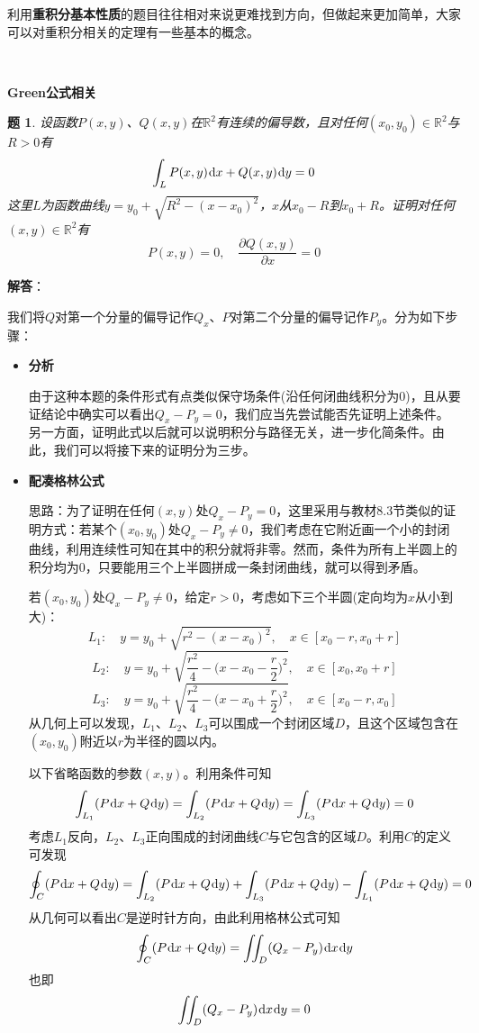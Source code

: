 \documentclass[a4paper,UTF8,fontset=windows,AutoFakeBold]{ctexart}
\newcommand*{\dr}{\hspace{0.07em}\mathrm{d}}
\newcommand*{\rb}{\mathbb{R}}
\newcommand*{\note}{\noindent *}
\theoremstyle{ex}
\newtheorem{exercise}{题}
\newcommand{\sol}[1]{{\vspace{5pt}\kaishu\noindent\textbf{解答}：\vspace{-3pt}
\begin{compactitem}
    \item[] #1
\end{compactitem}
}}
\begin{document}
\note 利用\textbf{重积分基本性质}的题目往往相对来说更难找到方向，但做起来更加简单，大家可以对重积分相关的定理有一些基本的概念。

\

\noindent\textbf{Green公式相关}
\begin{framed}
\begin{exercise}
    设函数$P(x,y)$、$Q(x,y)$在$\rb^2$有连续的偏导数，且对任何$(x_0,y_0)\in\rb^2$与$R>0$有
    $$\int_LP(x,y)\dr x+Q(x,y)\dr y=0$$
    这里$L$为函数曲线$y=y_0+\sqrt{R^2-(x-x_0)^2}$，$x$从$x_0-R$到$x_0+R$。证明对任何$(x,y)\in\rb^2$有
    $$P(x,y)=0,\quad\frac{\partial Q(x,y)}{\partial x}=0$$
\end{exercise}
\sol{
    我们将$Q$对第一个分量的偏导记作$Q_x$、$P$对第二个分量的偏导记作$P_y$。分为如下步骤：
    \begin{itemize}
        \item \textbf{分析}
        
        由于这种本题的条件形式有点类似保守场条件(沿任何闭曲线积分为0)，且从要证结论中确实可以看出$Q_x-P_y=0$，我们应当先尝试能否先证明上述条件。另一方面，证明此式以后就可以说明积分与路径无关，进一步化简条件。由此，我们可以将接下来的证明分为三步。
        
        \item \textbf{配凑格林公式}

        \note 思路：为了证明在任何$(x,y)$处$Q_x-P_y=0$，这里采用与教材8.3节类似的证明方式：若某个$(x_0,y_0)$处$Q_x-P_y\ne0$，我们考虑在它附近画一个小的封闭曲线，利用连续性可知在其中的积分就将非零。然而，条件为所有上半圆上的积分均为0，只要能用三个上半圆拼成一条封闭曲线，就可以得到矛盾。

        若$(x_0,y_0)$处$Q_x-P_y\ne0$，给定$r>0$，考虑如下三个半圆(定向均为$x$从小到大)：
        $$L_1:\quad y=y_0+\sqrt{r^2-(x-x_0)^2},\quad x\in[x_0-r,x_0+r]$$
        $$L_2:\quad y=y_0+\sqrt{\frac{r^2}{4}-\bigg(x-x_0-\frac{r}{2}\bigg)^2},\quad x\in[x_0,x_0+r]$$
        $$L_3:\quad y=y_0+\sqrt{\frac{r^2}{4}-\bigg(x-x_0+\frac{r}{2}\bigg)^2},\quad x\in[x_0-r,x_0]$$
        从几何上可以发现，$L_1$、$L_2$、$L_3$可以围成一个封闭区域$D$，且这个区域包含在$(x_0,y_0)$附近以$r$为半径的圆以内。

        以下省略函数的参数$(x,y)$。利用条件可知
        $$\int_{L_1}(P\dr x+Q\dr y)=\int_{L_2}(P\dr x+Q\dr y)=\int_{L_3}(P\dr x+Q\dr y)=0$$
        考虑$L_1$反向，$L_2$、$L_3$正向围成的封闭曲线$C$与它包含的区域$D$。利用$C$的定义可发现
        $$\oint_C(P\dr x+Q\dr y)=\int_{L_2}(P\dr x+Q\dr y)+\int_{L_3}(P\dr x+Q\dr y)-\int_{L_1}(P\dr x+Q\dr y)=0$$
        从几何可以看出$C$是逆时针方向，由此利用格林公式可知
        $$\oint_C(P\dr x+Q\dr y)=\iint_D(Q_x-P_y)\dr x\dr y$$
        也即
        $$\iint_D(Q_x-P_y)\dr x\dr y=0$$


\end{itemize}}
\end{framed}
\end{document}
